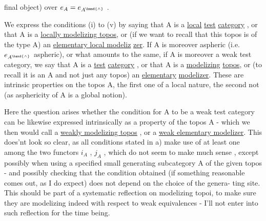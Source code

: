 
final object)  over $e_A = e_{A^{\hand{\wedge}}}$ .

We express the conditions (i) to (v)  by saying that A is a \uline{local}
\uline{test} \uline{category} ,  or that A\hand{\ensuremath{^{\wedge}}}\hand{/} is a \uline{locally modelizing topos},  or (if we want
to recall that this topos is of the  type A\hand{\ensuremath{^{\wedge}}}) an \uline{elementary local modeliz}
\uline{zer}.  If A is moreover aspheric  (i.e. $e_{A^{\hand{\wedge}}}$ aspheric),  or what amounts to
the same,  if A is moreover a weak test category,  we say that A is a
\uline{test} \uline{category} ,  or that A\hand{\ensuremath{^{\wedge}}} is a \uline{modelizing} \uline{topos}, or (to recall it is an
A\hand{\ensuremath{^{\wedge}}} and not just any topos) an \uline{elementary} \uline{modelizer}.  These are intrinsic
properties on the topos A\hand{\ensuremath{^{\wedge}}},  the first one of a local nature,  the second
not (as asphericity of A\hand{\ensuremath{^{\wedge}}} is a global notion).

Here the question arises whether the condition for A to be a weak 
test category can be likewise expressed intrinsically as a property of the
topos A\hand{\ensuremath{^{\wedge}}} -  which we then would call a \uline{weakly modelizing topos} ,  or a
\uline{weak elementary modelizer}.  This does'nt look so clear,  as all conditions
stated in a)  make use of at least one among the two functors $i_A$ , $j_A$ ,
which do not seem to make much sense , except  possibly when using a
specified small generating subcategory A of the given topos   -  and
possibly checking that the condition obtained (if something reasonable
comes out,  as I do expect) does not depend on the choice of the genera-%
ting site.  This should be part of a systematic reflection on modelizing
topoi,   to make sure  they are  modelizing indeed with respect to
weak equivalences  -   I'll not  enter into such reflection
for the time being.

